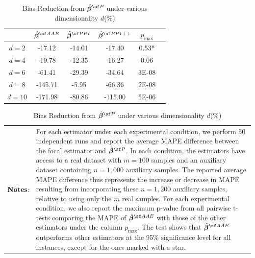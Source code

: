 \begin{table}[!ht]
\renewcommand{\arraystretch}{1.3}
\centering
{\footnotesize
\caption{Bias Reduction from $\hat{\betavec}^{\sf P}$ under various dimensionality $d$(\%)}
\label{tab:aae-ppi-synthetic}
\begin{tabular}{cccccc}
\hline\hline
& $\hat{\betavec}^{\sf AAE}$ & $\hat{\betavec}^{\sf PPI}$ & $\hat{\betavec}^{\sf PPI++}$ & $p_{\max}$ \\\hline
$d=2$ & -17.12 & -14.01 & -17.40 & 0.53* \\
$d=4$ & -19.78 & -12.35 & -16.27 & 0.06 \\
$d=6$ & -61.41 & -29.39 & -34.64 & 3E-08 \\
$d=8$ & -145.71 & -5.95 & -66.36 & 2E-08 \\
$d=10$ & -171.98 & -80.86 & -115.00 & 5E-06    \\\hline\hline
\end{tabular}
\begin{minipage}{15.5cm}
\vspace{3pt}
    \footnotesize
    \begin{tabular}{p{1cm} p{13cm}}
         \textbf{Notes}: & \setlength{\baselineskip}{1.2\baselineskip} 
    For each estimator under each experimental condition, we perform 50 independent runs and report the average MAPE difference between the focal estimator and $\hat{\betavec}^{\sf P}$. In each condition, the estimators have access to a real dataset with $m=100$ samples and an auxiliary dataset containing $n = 1{,}000$ auxiliary samples. The reported average MAPE difference thus represents the increase or decrease in MAPE resulting from incorporating these $n = 1{,}200$ auxiliary samples, relative to using only the $m$ real samples. For each experimental condition, we also report the maximum p-value from all pairwise t-tests comparing the MAPE of $\hat{\betavec}^{\sf AAE}$ with those of the other estimators under the column $p_{\max}$. The test shows that $\hat{\betavec}^{\sf AAE}$ outperforms other estimators at the 95\% significance level for all instances, except for the ones marked with a star.      
    \end{tabular}
  \end{minipage}}
\end{table}


